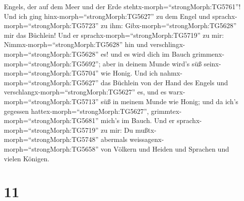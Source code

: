 Engels, der auf dem Meer und der Erde
stehtx-morph=``strongMorph:TG5761''!  Und ich ging
hinx-morph=``strongMorph:TG5627'' zu dem Engel und
sprachx-morph=``strongMorph:TG5723'' zu ihm:
Gibx-morph=``strongMorph:TG5628'' mir das Büchlein! Und er
sprachx-morph=``strongMorph:TG5719'' zu mir:
Nimmx-morph=``strongMorph:TG5628'' hin und
verschlingx-morph=``strongMorph:TG5628'' es! und es wird dich im Bauch
grimmenx-morph=``strongMorph:TG5692''; aber in deinem Munde wird's süß
seinx-morph=``strongMorph:TG5704'' wie Honig.  Und ich
nahmx-morph=``strongMorph:TG5627'' das Büchlein von der Hand des Engels
und verschlangx-morph=``strongMorph:TG5627'' es, und es
warx-morph=``strongMorph:TG5713'' süß in meinem Munde wie Honig; und da
ich's gegessen hattex-morph=``strongMorph:TG5627'',
grimmtex-morph=``strongMorph:TG5681'' mich's im Bauch.  Und
er sprachx-morph=``strongMorph:TG5719'' zu mir: Du
mußtx-morph=``strongMorph:TG5748'' abermals
weissagenx-morph=``strongMorph:TG5658'' von Völkern und Heiden und
Sprachen und vielen Königen.

\hypertarget{section-10}{%
\section{11}\label{section-10}}

